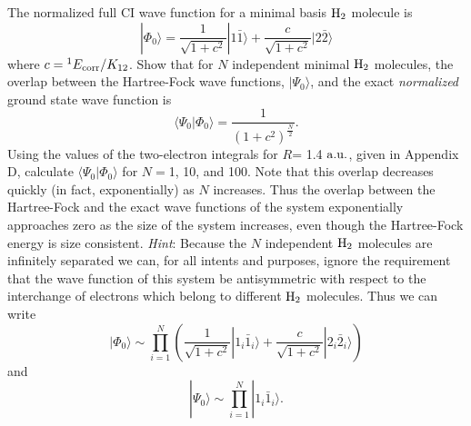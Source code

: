 \documentclass[a4paper]{book}
\newcounter{exercise}[chapter]
\newcommand{\au}{{\rm a.u.}}
\begin{document}
	\begin{exercise}
	The normalized full CI wave function for a minimal basis $\ce{H2}$ molecule is
	\[
		| \Phi_0 \rangle = \frac{1}{ \sqrt{1+c^2} } | 1 \bar{1} \rangle + \frac{c}{ \sqrt{1+c^2} } | 2 \bar{2} \rangle
	\]
	where $c = {}^{1}E_{\rm corr}/K_{12}$. Show that for $N$ independent minimal $\ce{H2}$ molecules, the overlap between the Hartree-Fock wave functions, $| \Psi_0 \rangle$, and the exact {\it normalized} ground state wave function is
	\[
		\langle \Psi_0 | \Phi_0 \rangle = \frac{1}{ (1+c^2)^{\frac{N}{2}} }.
	\]
	Using the values of the two-electron integrals for $R$= 1.4 $\au$, given in Appendix D, calculate $\langle \Psi_0 | \Phi_0 \rangle$ for $N=$1, 10, and 100. Note that this overlap decreases quickly (in fact, exponentially) as $N$ increases. Thus the overlap between the Hartree-Fock and the exact wave functions of the system exponentially approaches zero as the size of the system increases, even though the Hartree-Fock energy is size consistent. {\it Hint}: Because the $N$ independent $\ce{H2}$ molecules are infinitely separated we can, for all intents and purposes, ignore the requirement that the wave function of this system be antisymmetric with respect to the interchange of electrons which belong to different $\ce{H2}$ molecules. Thus we can write
	\[
		| \Phi_0 \rangle \sim \prod_{i=1}^N \left( \frac{1}{ \sqrt{ 1 + c^2 } } | 1_i \bar{1}_i \rangle + \frac{c}{ \sqrt{ 1 + c^2 } } | 2_i \bar{2}_i \rangle \right)
	\]
	and
	\[
		| \Psi_0 \rangle \sim \prod_{i=1}^N | 1_i \bar{1}_i \rangle.
	\]
	\end{exercise}
	
\end{document}
